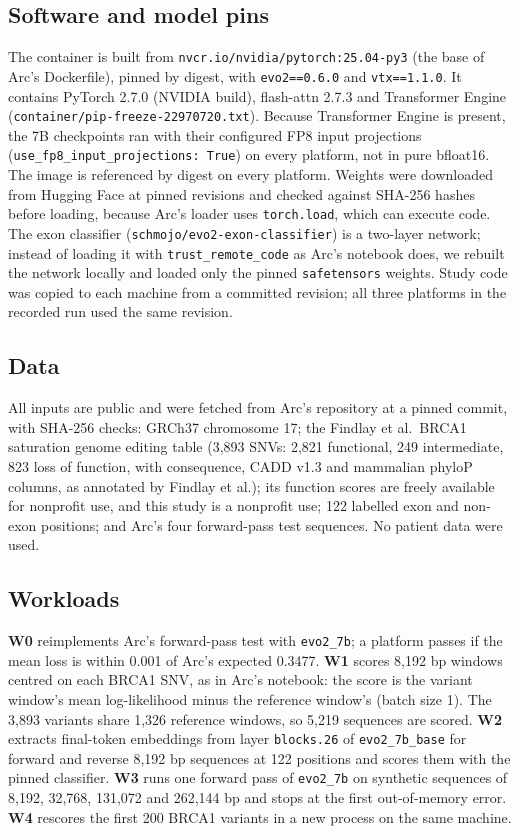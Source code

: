 \documentclass[11pt]{article}
\newcommand{\code}[1]{\texttt{#1}}
\begin{document}
\subsection{Software and model pins}
The container is built from \code{nvcr.io/nvidia/pytorch:25.04-py3} (the base of Arc's Dockerfile),
pinned by digest, with \code{evo2==0.6.0} and \code{vtx==1.1.0}. It contains PyTorch
2.7.0 (NVIDIA build), flash-attn 2.7.3 and Transformer Engine (\code{container/pip-freeze-22970720.txt}).
Because Transformer Engine is present, the 7B checkpoints ran with their configured FP8 input
projections (\code{use\_fp8\_input\_projections: True}) on every platform, not in pure bfloat16.
The image is referenced by digest on every platform. Weights were downloaded from Hugging Face at
pinned revisions and checked against SHA-256 hashes before loading, because Arc's loader uses
\code{torch.load}, which can execute code. The exon classifier (\code{schmojo/evo2-exon-classifier})
is a two-layer network; instead of loading it with \code{trust\_remote\_code} as Arc's notebook
does, we rebuilt the network locally and loaded only the pinned \code{safetensors} weights. Study
code was copied to each machine from a committed revision; all three platforms in the recorded run
used the same revision.

\subsection{Data}
All inputs are public and were fetched from Arc's repository at a pinned commit, with SHA-256
checks: GRCh37 chromosome 17; the Findlay et al.\ BRCA1 saturation genome editing table
\cite{findlay2018} (3,893 SNVs: 2,821 functional, 249 intermediate, 823 loss of function, with
consequence, CADD v1.3 and mammalian phyloP columns, as annotated by Findlay et al.); its function
scores are freely available for nonprofit use, and this study is a nonprofit use; 122 labelled exon and non-exon positions; and
Arc's four forward-pass test sequences. No patient data were used.

\subsection{Workloads}
\textbf{W0} reimplements Arc's forward-pass test with \code{evo2\_7b}; a platform passes if the mean
loss is within 0.001 of Arc's expected 0.3477. \textbf{W1} scores 8,192 bp windows centred on each
BRCA1 SNV, as in Arc's notebook: the score is the variant window's mean log-likelihood minus the
reference window's (batch size 1). The 3,893 variants share 1,326 reference windows, so 5,219
sequences are scored. \textbf{W2} extracts final-token embeddings from layer \code{blocks.26} of
\code{evo2\_7b\_base} for forward and reverse 8,192 bp sequences at 122 positions and scores them
with the pinned classifier. \textbf{W3} runs one forward pass of \code{evo2\_7b} on synthetic
sequences of 8,192, 32,768, 131,072 and 262,144 bp and stops at the first out-of-memory error.
\textbf{W4} rescores the first 200 BRCA1 variants in a new process on the same machine.
\end{document}
